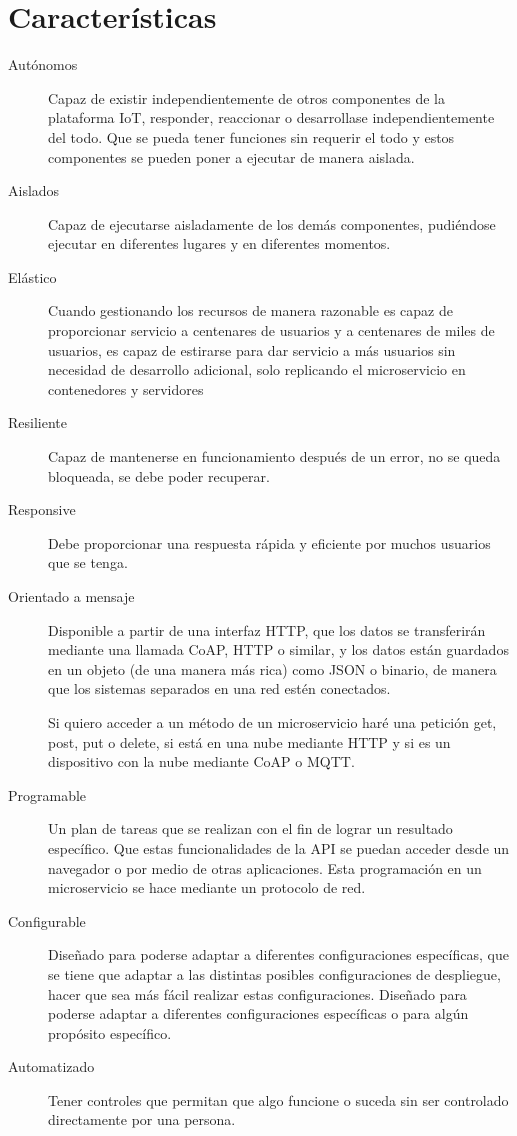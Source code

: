 \documentclass[12pt, twoside, openright]{report} %
\begin{document}
\section{Características}
\begin{description}
	\item[Autónomos] Capaz de existir independientemente de otros componentes de la plataforma IoT, responder, reaccionar o desarrollase independientemente del todo. Que se pueda tener funciones sin requerir el todo y estos componentes se pueden poner a ejecutar de manera aislada.
	\item[Aislados] Capaz de ejecutarse aisladamente de los demás componentes, pudiéndose ejecutar en diferentes lugares y en diferentes momentos.
	      \pagebreak
	\item[Elástico] Cuando gestionando los recursos de manera razonable es capaz de proporcionar servicio a centenares de usuarios y a centenares de miles de usuarios, es capaz de estirarse para dar servicio a más usuarios sin necesidad de desarrollo adicional, solo replicando el microservicio en contenedores y servidores
	\item[Resiliente] Capaz de mantenerse en funcionamiento después de un error, no se queda bloqueada, se debe poder recuperar.
	\item[Responsive] Debe proporcionar una respuesta rápida y eficiente por muchos usuarios que se tenga.
	\item[Orientado a mensaje] Disponible a partir de una interfaz HTTP, que los datos se transferirán mediante una llamada CoAP, HTTP o similar, y los datos están guardados en un objeto (de una manera más rica) como JSON o binario, de manera que los sistemas separados en una red estén conectados.

	      Si quiero acceder a un método de un microservicio haré una petición get, post, put o delete, si está en una nube mediante HTTP y si es un dispositivo con la nube mediante CoAP o MQTT.

	\item[Programable] Un plan de tareas que se realizan con el fin de lograr un resultado específico. Que estas funcionalidades de la API se puedan acceder desde un navegador o por medio de otras aplicaciones. Esta programación en un microservicio se hace mediante un protocolo de red.
	\item[Configurable] Diseñado para poderse adaptar a diferentes configuraciones específicas, que se tiene que adaptar a las distintas posibles configuraciones de despliegue, hacer que sea más fácil realizar estas configuraciones. Diseñado para poderse adaptar a diferentes configuraciones específicas o para algún propósito específico.
	\item[Automatizado] Tener controles que permitan que algo funcione o suceda sin ser controlado directamente por una persona.
\end{description}
\end{document}
